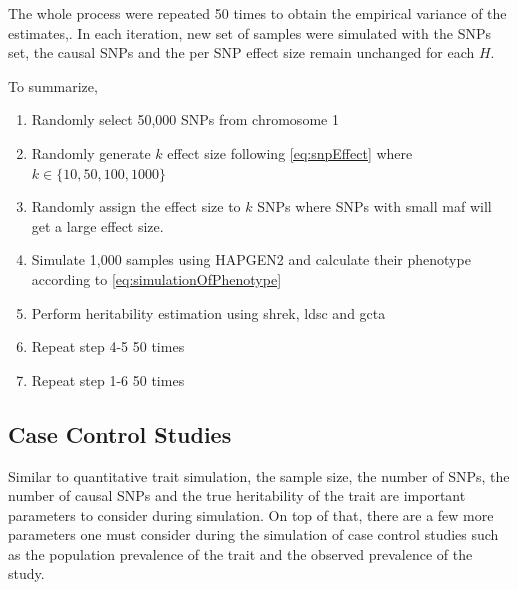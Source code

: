 			The whole process were repeated 50 times to obtain the empirical variance of the estimates,.
			In each iteration, new set of samples were simulated with the \glspl{SNP} set, the causal \glspl{SNP} and the per \gls{SNP} effect size remain unchanged for each $H$.
			
			To summarize, 
			\begin{enumerate}
				\item Randomly select 50,000 \glspl{SNP} from chromosome 1
				\item Randomly generate $k$ effect size following \cref{eq:snpEffect} where $k \in \{10,50,100,1000\}$
				\item Randomly assign the effect size to $k$ \glspl{SNP} where \glspl{SNP} with small \gls{maf} will get a large effect size.
				\item Simulate 1,000 samples using HAPGEN2 and calculate their phenotype according to \cref{eq:simulationOfPhenotype}
				\item Perform heritability estimation using \gls{shrek}, \gls{ldsc} and  \gls{gcta}
				\item Repeat step 4-5 50 times
				\item Repeat step 1-6 50 times
			\end{enumerate}
			
			
		\subsection{Case Control Studies}
		Similar to quantitative trait simulation, the sample size, the number of \glspl{SNP}, the number of causal \glspl{SNP} and the true heritability of the trait are important parameters to consider during simulation. 
		On top of that, there are a few more parameters one must consider during the simulation of case control studies such as the population prevalence of the trait and the observed prevalence of the study. 
		
